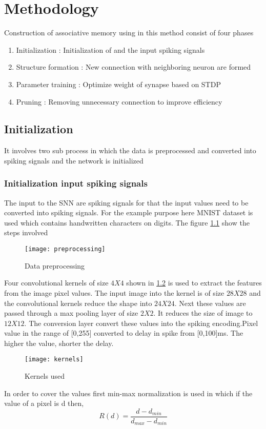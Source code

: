 \chapter{Methodology}%
Construction of associative memory using \Snn\cite{base} in this method consist of four phases
\begin{enumerate}
    \itemsep 0em
    \item Initialization : Initialization of \Snn and the input spiking signals
    \item Structure formation : New connection with neighboring neuron are formed
    \item Parameter training : Optimize weight of synapse based on STDP
    \item Pruning : Removing unnecessary connection to improve efficiency
\end{enumerate}
\section{Initialization}
It involves two sub process in which the data is preprocessed and converted
into spiking signals and the network is initialized
\subsection{Initialization input spiking signals}
The input to the SNN are spiking signals for that the input values need to be
converted into spiking signals. For the example purpose here MNIST dataset is
used which contains handwritten characters on digits. The figure
\ref{preprocessing} show the steps involved

\begin{figure}[h!]
    \centering
    \texttt{[image: preprocessing]}
    \caption{Data preprocessing}
    \label{preprocessing}
\end{figure}

Four convolutional kernels of size $4X4$ shown in \ref{kernel} is used to
extract the features from the image pixel values. The input image into the
kernel is of size $28X28$ and the convolutional kernels reduce the shape into
$24X24$. Next these values are passed through a max pooling layer of size
$2X2$. It reduces the size of image to $12X12$. The conversion layer convert
these values into the spiking encoding.Pixel value in the range of [0,255]
converted to delay in spike from [0,100]ms. The higher the value, shorter the
delay.
\begin{figure}[h!]
    \centering
    \texttt{[image: kernels]}
    \caption{Kernels used}
    \label{kernel}
\end{figure}
In order to cover the values first min-max normalization is used in which if
the value of a pixel is d then,
\begin{equation*}
    R(d)=\frac{d-d_{min}}{d_{max}-d_{min}}
\end{equation*}


